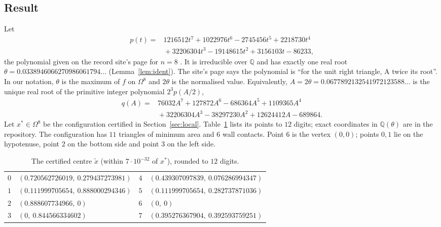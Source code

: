 \documentclass[11pt]{amsart}
\theoremstyle{definition}
\newcommand{\Q}{\mathbb{Q}}
\newcommand{\Om}{\Omega}
\begin{document}
\subsection*{Result}
Let
\[
 \begin{aligned} p(t) = {}&1216512 t^7 + 1022976 t^6 - 2745456 t^5 + 2218730 t^4\\ &{}+ 32206304 t^3 - 19148615 t^2 + 3156103 t - 86233, \end{aligned}
\]
the polynomial given on the record site's page for $n = 8$ \cite{Stead}. %
It is irreducible over $\Q$ and has exactly one real root $\theta = 0.0338946066270986061794\ldots$ (Lemma~\ref{lem:ident}). The site's page says the polynomial is ``for the unit right triangle, A twice its root''. In our notation, $\theta$ is the maximum of $f$ on $\Om^8$ and $2\theta$ is the normalised value. Equivalently, $A = 2\theta = 0.0677892132541972123588\ldots$ is the unique real root of the primitive integer polynomial $2^3 p(A/2)$,
\[
 \begin{aligned} q(A) = {}&76032A^7 + 127872A^6 - 686364A^5 + 1109365A^4\\ &{}+ 32206304A^3 - 38297230A^2 + 12624412A - 689864 . \end{aligned}
\]
Let $x^* \in \Om^8$ be the configuration certified in Section~\ref{sec:local}. Table~\ref{tab:config} lists its points to $12$ digits; exact coordinates in $\Q(\theta)$ are in the repository. The configuration has $11$ triangles of minimum area and $6$ wall contacts. Point $6$ is the vertex $(0,0)$; points $0,1$ lie on the hypotenuse, point $2$ on the bottom side and point $3$ on the left side. %
\begin{table}[htbp]
\centering\small
\caption{The certified centre $\tilde x$ (within $7\cdot10^{-32}$ of $x^*$), rounded to $12$ digits.}\label{tab:config}
\begin{tabular}{@{}c@{\quad}l@{\qquad}c@{\quad}l@{}}
\toprule
$0$ & $(0.720562726019,\ 0.279437273981)$ & $4$ & $(0.439307097839,\ 0.076286994347)$\\
$1$ & $(0.111999705654,\ 0.888000294346)$ & $5$ & $(0.111999705654,\ 0.282737871036)$\\
$2$ & $(0.888607734966,\ 0)$ & $6$ & $(0,\ 0)$\\
$3$ & $(0,\ 0.844566334602)$ & $7$ & $(0.395276367904,\ 0.392593759251)$\\
\bottomrule
\end{tabular}
\end{table}
\end{document}
